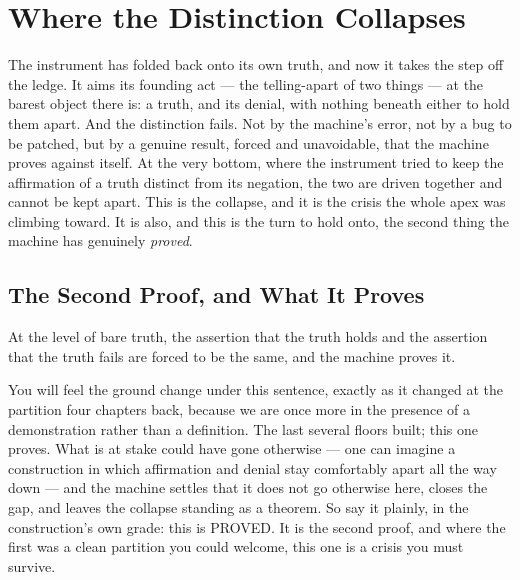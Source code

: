 \chapter{Where the Distinction Collapses}

The instrument has folded back onto its own truth, and now it takes the step off the ledge. It aims its founding
act --- the telling-apart of two things --- at the barest object there is: a truth, and its denial, with nothing
beneath either to hold them apart. And the distinction fails. Not by the machine's error, not by a bug to be
patched, but by a genuine result, forced and unavoidable, that the machine proves against itself. At the very
bottom, where the instrument tried to keep the affirmation of a truth distinct from its negation, the two are
driven together and cannot be kept apart. This is the collapse, and it is the crisis the whole apex was climbing
toward. It is also, and this is the turn to hold onto, the second thing the machine has genuinely \emph{proved}.

\section{The Second Proof, and What It Proves}

At the level of bare truth, the assertion that the truth holds and the assertion that the truth fails are forced
to be the same, and the machine proves it.

You will feel the ground change under this sentence, exactly as it changed at the partition four chapters back,
because we are once more in the presence of a demonstration rather than a definition. The last several floors
built; this one proves. What is at stake could have gone otherwise --- one can imagine a construction in which
affirmation and denial stay comfortably apart all the way down --- and the machine settles that it does not go
otherwise here, closes the gap, and leaves the collapse standing as a theorem. So say it plainly, in the
construction's own grade: this is PROVED. It is the second proof, and where the first was a clean partition you could welcome,
this one is a crisis you must survive.

